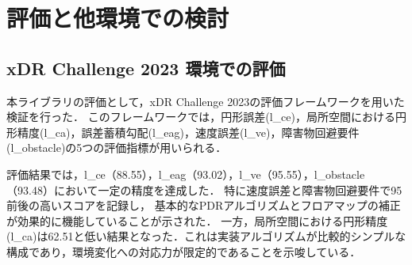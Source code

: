 \documentclass[a4paper, 10pt, twocolumn]{jarticle}
\begin{document}
%
%
%
%


\section{評価と他環境での検討}

\subsection{xDR Challenge 2023 環境での評価}

本ライブラリの評価として，xDR Challenge 2023の評価フレームワークを用いた検証を行った．
このフレームワークでは，円形誤差(l\_ce)，局所空間における円形精度(l\_ca)，誤差蓄積勾配(l\_eag)，速度誤差(l\_ve)，障害物回避要件(l\_obstacle)の5つの評価指標が用いられる．

評価結果では，l\_ce（88.55），l\_eag（93.02），l\_ve（95.55），l\_obstacle（93.48）において一定の精度を達成した．
特に速度誤差と障害物回避要件で95前後の高いスコアを記録し，
基本的なPDRアルゴリズムとフロアマップの補正が効果的に機能していることが示された．
一方，局所空間における円形精度(l\_ca)は62.51と低い結果となった．これは実装アルゴリズムが比較的シンプルな構成であり，環境変化への対応力が限定的であることを示唆している．
\end{document}
